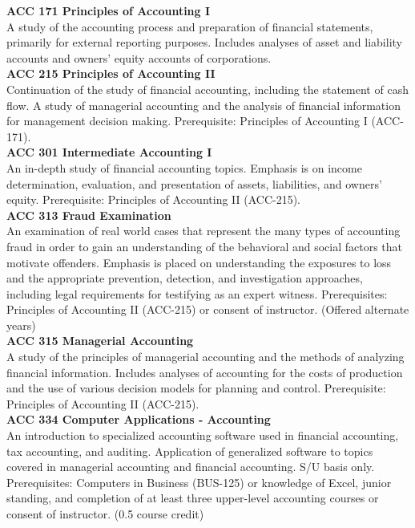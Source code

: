\documentclass[
  letterpaper,
]{scrbook}
\begin{document}
\textbf{ACC 171 Principles of Accounting I}\\
A study of the accounting process and preparation of financial
statements, primarily for external reporting purposes. Includes analyses
of asset and liability accounts and owners' equity accounts of
corporations.\\
\textbf{ACC 215 Principles of Accounting II}\\
Continuation of the study of financial accounting, including the
statement of cash flow. A study of managerial accounting and the
analysis of financial information for management decision making.
Prerequisite: Principles of Accounting I (ACC-171).\\
\textbf{ACC 301 Intermediate Accounting I}\\
An in-depth study of financial accounting topics. Emphasis is on income
determination, evaluation, and presentation of assets, liabilities, and
owners' equity. Prerequisite: Principles of Accounting II (ACC-215).\\
\textbf{ACC 313 Fraud Examination}\\
An examination of real world cases that represent the many types of
accounting fraud in order to gain an understanding of the behavioral and
social factors that motivate offenders. Emphasis is placed on
understanding the exposures to loss and the appropriate prevention,
detection, and investigation approaches, including legal requirements
for testifying as an expert witness. Prerequisites: Principles of
Accounting II (ACC-215) or consent of instructor. (Offered alternate
years)\\
\textbf{ACC 315 Managerial Accounting}\\
A study of the principles of managerial accounting and the methods of
analyzing financial information. Includes analyses of accounting for the
costs of production and the use of various decision models for planning
and control. Prerequisite: Principles of Accounting II (ACC-215).\\
\textbf{ACC 334 Computer Applications - Accounting}\\
An introduction to specialized accounting software used in financial
accounting, tax accounting, and auditing. Application of generalized
software to topics covered in managerial accounting and financial
accounting. S/U basis only. Prerequisites: Computers in Business
(BUS-125) or knowledge of Excel, junior standing, and completion of at
least three upper-level accounting courses or consent of instructor.
(0.5 course credit)\\
\end{document}
